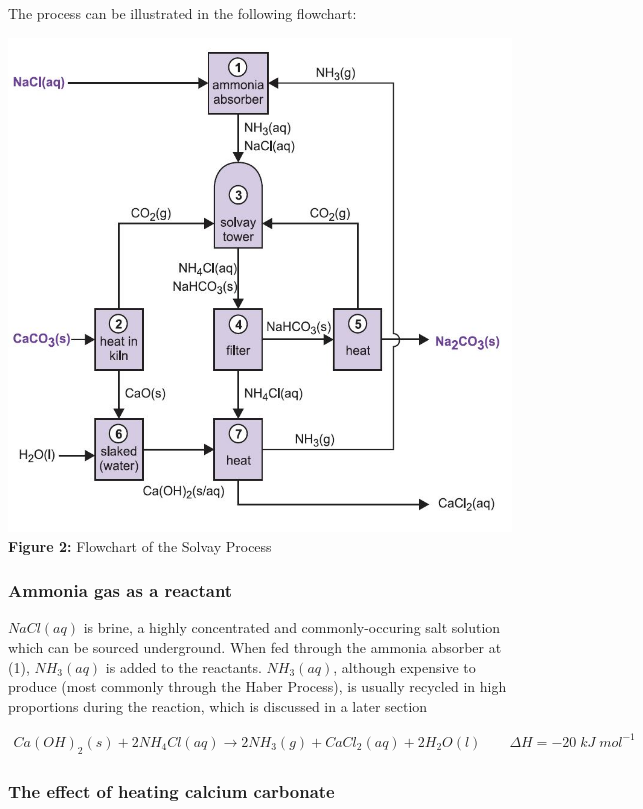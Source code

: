 \documentclass[12pt, a4paper]{article}
\begin{document}
The process can be illustrated in the following flowchart:

\begin{center}
\includegraphics[scale=0.6]{solvay.jpeg}
\\
\textbf{Figure 2:} Flowchart of the Solvay Process
\end{center}




\subsubsection{Ammonia gas as a reactant}

\(NaCl(aq)\) is brine, a highly concentrated and commonly-occuring salt solution which can be sourced underground. When fed through the ammonia absorber at (1),  \(NH_{3}(aq)\) is added to the reactants. \(NH_{3}(aq)\), although expensive to produce (most commonly through the Haber Process), is usually recycled in high proportions during the reaction, which is discussed in a later section


\begin{align}
	Ca(OH)_{2}(s) + 2NH_{4}Cl(aq) \rightarrow 2NH_{3}(g) + CaCl_{2}(aq) + 2H_{2}O(l) \qquad \Delta H = -20 \; kJ \; mol^{-1}
\end{align}


\subsubsection{The effect of heating calcium carbonate}
\end{document}
